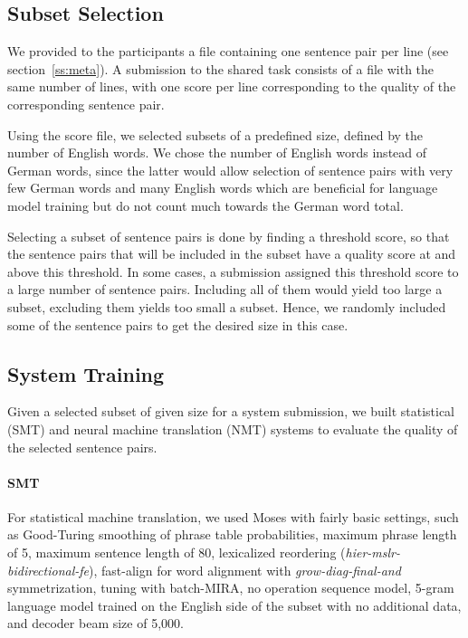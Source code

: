 \documentclass[11pt,a4paper]{article}
\begin{document}
\subsection{Subset Selection}
We provided to the participants a file containing one sentence pair per line (see section~\ref{ss:meta}). A submission to the shared task consists of a file with the same number of lines, with one score per line corresponding to the quality of the corresponding sentence pair.

Using the score file, we selected subsets of a predefined size, defined by the number of English words. We chose the number of English words instead of German words, since the latter would allow selection of sentence pairs with very few German words and many English words which are beneficial for language model training but do not count much towards the German word total.

Selecting a subset of sentence pairs is done by finding a threshold score, so that the sentence pairs that will be included in the subset have a quality score at and above this threshold.
In some cases, a submission assigned this threshold score to a large number of sentence pairs. Including all of them would yield too large a subset, excluding them yields too small a subset. Hence, we randomly included some of the sentence pairs to get the desired size in this case.

\subsection{System Training}
Given a selected subset of given size for a system submission, we built statistical (SMT) and neural machine translation (NMT) systems to evaluate the quality of the selected sentence pairs.

\paragraph{\bf SMT} For statistical machine translation, we used Moses \citep{koehn-EtAl:2007:PosterDemo} with fairly basic settings, such as Good-Turing smoothing of phrase table probabilities, maximum phrase length of 5, maximum sentence length of 80, lexicalized reordering ({\em hier-mslr-bidirectional-fe}), fast-align for word alignment with {\em grow-diag-final-and} symmetrization, tuning with batch-MIRA, no operation sequence model, 5-gram language model trained on the English side of the subset with no additional data, and decoder beam size of 5,000.
\end{document}
